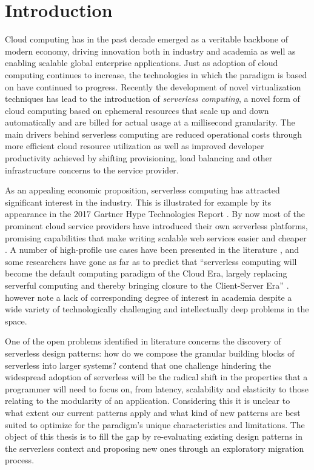 \chapter{Introduction} \label{cha:introduction}

Cloud computing has in the past decade emerged as a veritable backbone of modern economy, driving innovation both in industry and academia as well as enabling scalable global enterprise applications. Just as adoption of cloud computing continues to increase, the technologies in which the paradigm is based on have continued to progress. Recently the development of novel virtualization techniques has lead to the introduction of \textit{serverless computing}, a novel form of cloud computing based on ephemeral resources that scale up and down automatically and are billed for actual usage at a millisecond granularity. The main drivers behind serverless computing are reduced operational costs through more efficient cloud resource utilization as well as improved developer productivity achieved by shifting provisioning, load balancing and other infrastructure concerns to the service provider. \parencite{buyya2017manifesto}

As an appealing economic proposition, serverless computing has attracted significant interest in the industry. This is illustrated for example by its appearance in the 2017 Gartner Hype Technologies Report \parencite{walker17gartnerHype}. By now most of the prominent cloud service providers have introduced their own serverless platforms, promising capabilities that make writing scalable web services easier and cheaper \parencite{awslambda0218, google18cloudFunctions, ibm18cloudFunctions, microsoft18azureFunctions}. A number of high-profile use cases have been presented in the literature \parencite{cncf18serverlessWG}, and some researchers have gone as far as to predict that ``serverless computing will become the default computing paradigm of the Cloud Era, largely replacing serverful computing and thereby bringing closure to the Client-Server Era'' \parencite{jonas19berkeleyView}. \textcite{baldini17currentTrends} however note a lack of corresponding degree of interest in academia despite a wide variety of technologically challenging and intellectually deep problems in the space.

One of the open problems identified in literature concerns the discovery of serverless design patterns: how do we compose the granular building blocks of serverless into larger systems? \parencite{baldini17currentTrends} \textcite{varghese18next} contend that one challenge hindering the widespread adoption of serverless will be the radical shift in the properties that a programmer will need to focus on, from latency, scalability and elasticity to those relating to the modularity of an application. Considering this it is unclear to what extent our current patterns apply and what kind of new patterns are best suited to optimize for the paradigm's unique characteristics and limitations. The object of this thesis is to fill the gap by re-evaluating existing design patterns in the serverless context and proposing new ones through an exploratory migration process.

